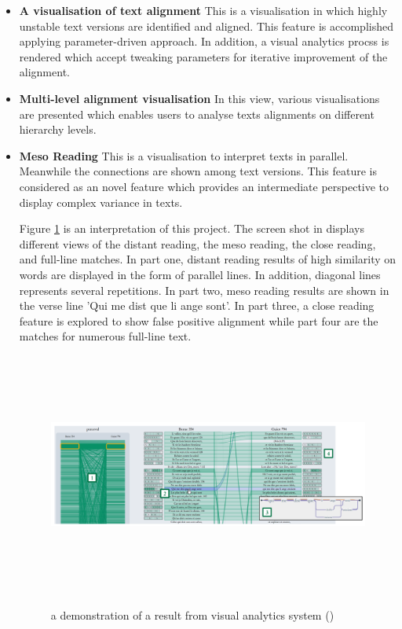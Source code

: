 \begin{itemize}
	\item \textbf{A visualisation of text alignment} This is a visualisation in which highly unstable text versions are identified and aligned. This feature is accomplished applying parameter-driven approach. In addition, a visual analytics procss is rendered which accept tweaking parameters for iterative improvement of the alignment.
	\item \textbf{Multi-level alignment visualisation} In this view, various visualisations are presented which enables users to analyse texts alignments on different hierarchy levels.
	\item \textbf{Meso Reading} This is a visualisation to interpret texts in parallel. Meanwhile the connections are shown among text versions. This feature is considered as an novel feature which provides an intermediate perspective to display complex variance in texts.
	
Figure \ref{fig:mesoReading} is an interpretation of this project. The screen shot in \cite{Stefan2017} displays different views of the distant reading, the meso reading, the close reading, and full-line matches. In part one, distant reading results of high similarity on words are displayed in the form of parallel lines. In addition, diagonal lines represents several repetitions. In part two, meso reading results are shown in the verse line 'Qui me dist que li ange sont'. In part three, a close reading feature is explored to show false positive alignment while part four are the matches for numerous full-line text.
	
	\begin{figure}[H]
		\centering	
		\includegraphics[width=13cm, height=8cm]{Figs/Meso-Reading}\\[1ex]
		\caption{a demonstration of a result from visual analytics system (\cite{Stefan2017})}
		\label{fig:mesoReading}
	\end{figure} 

	
\end{itemize}

